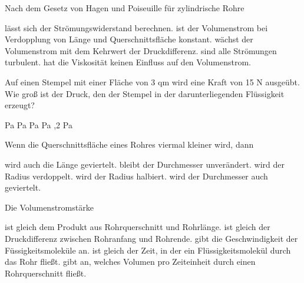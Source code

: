 \documentclass[11pt]{exam}
\begin{document}
\setlength{\voffset}{-0.5in}
\setlength{\headsep}{5pt}

\hspace{2mm}
 \hspace{5mm}
\vspace{4mm}

\begin{questions}

\question Nach dem Gesetz von Hagen und Poiseuille für zylindrische Rohre

\begin{choices}
	\choice lässt sich der Strömungswiderstand berechnen.
	\choice ist der Volumenstrom bei Verdopplung von Länge und Querschnittsfläche konstant.
	\choice wächst der Volumenstrom mit dem Kehrwert der Druckdifferenz.
	\choice sind alle Strömungen turbulent.
	\choice hat die Viskosität keinen Einfluss auf den Volumenstrom.
\end{choices}

\vspace{3mm}\question Auf einen Stempel mit einer Fläche von 3 qm wird eine Kraft von 15 N ausgeübt. Wie groß ist der Druck, den der Stempel in der darunterliegenden Flüssigkeit erzeugt?

\begin{choices}
	 Pa
	 Pa
	 Pa
	 Pa
	,2 Pa
\end{choices}

\vspace{3mm}\question Wenn die Querschnittsfläche eines Rohres viermal kleiner wird, dann

\begin{choices}
	\choice wird auch die Länge geviertelt.
	\choice bleibt der Durchmesser unverändert.
	\choice wird der Radius verdoppelt.
	\choice wird der Radius halbiert.
	\choice wird der Durchmesser auch geviertelt.
\end{choices}

\vspace{3mm}\question Die Volumenstromstärke

\begin{choices}
	\choice ist gleich dem Produkt aus Rohrquerschnitt und Rohrlänge.
	\choice ist gleich der Druckdifferenz zwischen Rohranfang und Rohrende.
	\choice gibt die Geschwindigkeit der Füssigkeitsmoleküle an.
	\choice ist gleich der Zeit, in der ein Flüssigkeitsmolekül durch das Rohr fließt.
	\choice gibt an, welches Volumen pro Zeiteinheit durch einen Rohrquerschnitt fließt.
\end{choices}


\end{questions}
\end{document}
